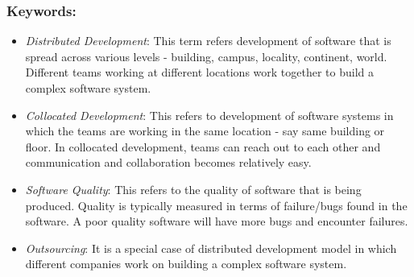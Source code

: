 \documentclass{sig-alternate-05-2015}
\begin{document}
\subsubsection{Keywords:}
\begin{itemize}
\item \emph{Distributed Development}: This term refers development of software that is spread across various levels - building, campus, locality, continent, world. Different teams working at different locations work together to build a complex software system.
\item \emph{Collocated Development}: This refers to development of software systems in which the teams are working in the same location - say same building or floor. In collocated development, teams can reach out to each other and communication and collaboration becomes relatively easy.
\item \emph{Software Quality}: This refers to the quality of software that is being produced. Quality is typically measured in terms of failure/bugs found in the software. A poor quality software will have more bugs and encounter failures.
\item \emph{Outsourcing}: It is a special case of distributed development model in which different companies work on building a complex software system.
\end{itemize} 
\end{document}
